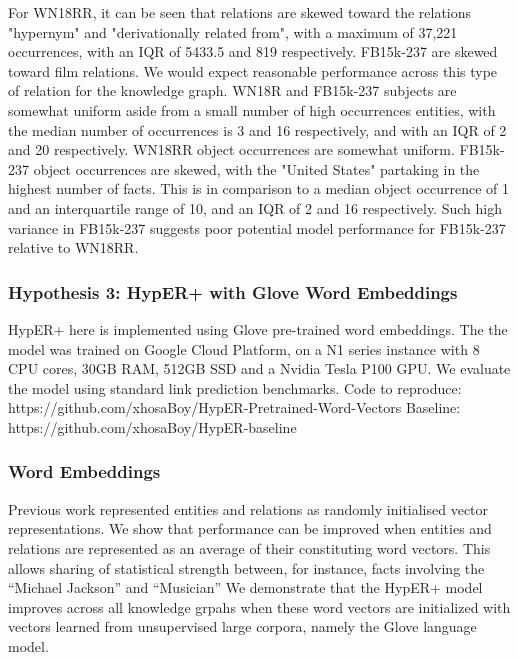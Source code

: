 For WN18RR, it can be seen that relations are skewed toward the relations "hypernym" and "derivationally related from", with a maximum of 37,221 occurrences, with an IQR of 5433.5 and 819 respectively. \newline
FB15k-237 are skewed toward film relations. We would expect reasonable performance across this type of relation for the knowledge graph. \newline
WN18R and FB15k-237 subjects are somewhat uniform aside from a small number of high occurrences entities, with the median number of occurrences is 3 and 16 respectively, and with an IQR of 2 and 20 respectively. 
WN18RR object occurrences are somewhat uniform. FB15k-237 object occurrences are skewed, with the "United States" partaking in the highest number of facts. This is in comparison to a median object occurrence of 1 and an interquartile range of 10,
and an IQR of 2 and 16 respectively. \newline
Such high variance in FB15k-237 suggests poor potential model performance for FB15k-237 relative to WN18RR.  


\subsubsection{Hypothesis 3: \newline 
HypER+ with Glove Word Embeddings}
HypER+ here is implemented using Glove pre-trained word embeddings. \newline
The the model was trained on Google Cloud Platform, on a N1 series instance with  8 CPU cores, 30GB RAM, 512GB SSD and a Nvidia Tesla P100 GPU. \newline
We evaluate the model using standard link prediction benchmarks. \newline 
Code to reproduce: https://github.com/xhosaBoy/HypER-Pretrained-Word-Vectors \newline
Baseline: https://github.com/xhosaBoy/HypER-baseline

\subsubsection{Word Embeddings}
Previous work represented entities and relations as randomly initialised vector representations. We show that performance can be improved when entities and relations are represented as an average of their constituting word vectors. 
This allows sharing of statistical strength between, for instance, facts involving the “Michael Jackson” and “Musician” We demonstrate that the HypER+ model improves across all knowledge grpahs when these word vectors are initialized 
with vectors learned from unsupervised large corpora, namely the Glove language model.

